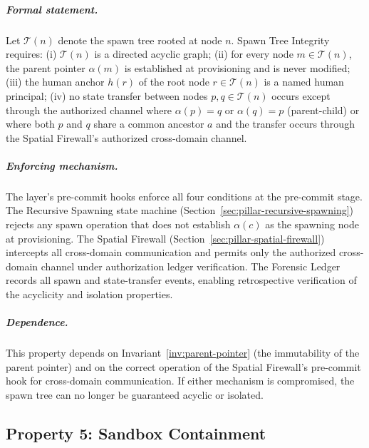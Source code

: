 
\subparagraph{Formal statement.}  Let $\mathcal{T}(n)$ denote the spawn tree
rooted at node $n$.  Spawn Tree Integrity requires: (i) $\mathcal{T}(n)$ is a
directed acyclic graph; (ii) for every node $m \in \mathcal{T}(n)$, the parent
pointer $\alpha(m)$ is established at provisioning and is never modified; (iii)
the human anchor $h(r)$ of the root node $r \in \mathcal{T}(n)$ is a named
human principal; (iv) no state transfer between nodes $p, q \in \mathcal{T}(n)$
occurs except through the authorized channel where $\alpha(p) = q$ or
$\alpha(q) = p$ (parent-child) or where both $p$ and $q$ share a common
ancestor $a$ and the transfer occurs through the Spatial Firewall's authorized
cross-domain channel.

\subparagraph{Enforcing mechanism.}  The \fact{} layer's pre-commit hooks
enforce all four conditions at the pre-commit stage.  The Recursive Spawning
state machine (Section~\ref{sec:pillar-recursive-spawning}) rejects any spawn operation that does
not establish $\alpha(c)$ as the spawning node at provisioning.  The Spatial
Firewall (Section~\ref{sec:pillar-spatial-firewall}) intercepts all cross-domain communication
and permits only the authorized cross-domain channel under authorization ledger
verification.  The Forensic Ledger records all spawn and state-transfer events,
enabling retrospective verification of the acyclicity and isolation properties.

\subparagraph{Dependence.}  This property depends on Invariant~\ref{inv:parent-pointer}
(the immutability of the parent pointer) and on the correct operation of the
Spatial Firewall's pre-commit hook for cross-domain communication.  If either
mechanism is compromised, the spawn tree can no longer be guaranteed acyclic
or isolated.

\subsection{Property 5: Sandbox Containment}\label{sec:sandbox-containment}

